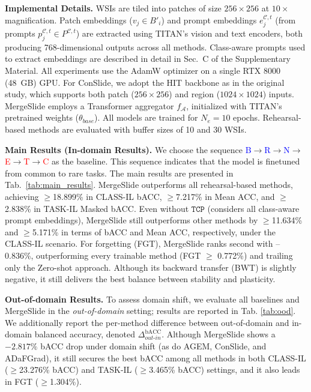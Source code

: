 \documentclass[10pt,twocolumn,letterpaper]{article}
\begin{document}
\noindent\textbf{Implemental Details.} WSIs are tiled into patches of size $256 \times 256$ at $10\times$ magnification. Patch embeddings ($v_j \in B'_i$) and prompt embeddings $e^{\mathcal{C},t}_j$ (from prompts $p^{\mathcal{C},t}_j \in P^{\mathcal{C},t}$) are extracted using TITAN's vision and text encoders, both producing 768-dimensional outputs across all methods. {Class-aware prompts used to extract embeddings are described in detail in Sec.~C of the Supplementary Material.} All experiments use the AdamW optimizer \cite{loshchilov2017decoupled} on a single RTX 8000 (48~GB) GPU. For ConSlide, we adopt the HIT backbone as in the original study, which supports both patch ($256\times256$) and region ($1024\times1024$) inputs. MergeSlide employs a Transformer aggregator $f_{\mathcal{A}}$, initialized with TITAN’s pretrained weights ($\theta_{{base}}$). All models are trained for $N_e = 10$ epochs. Rehearsal-based methods are evaluated with buffer sizes of 10 and 30 WSIs.

\noindent\textbf{Main Results (In-domain Results).} We choose the sequence \textcolor{blue}{B}$\rightarrow$\textcolor{blue}{R}$\rightarrow$\textcolor{blue}{N}$\rightarrow$\textcolor{red}{E}$\rightarrow$\textcolor{red}{T}$\rightarrow$\textcolor{red}{C} as the baseline. This sequence indicates that the model is finetuned from common to rare tasks. The main results are presented in Tab.~\ref{tab:main_results}. MergeSlide outperforms all rehearsal-based methods, achieving $\geq$18.899\% in CLASS-IL bACC, $\geq$7.217\% in Mean ACC, and $\geq$2.838\% in TASK-IL Masked bACC. Even without $\texttt{TCP}$ (considers all class-aware prompt embeddings), MergeSlide still outperforms other methods by $\geq$11.634\% and $\geq$5.171\% in terms of bACC and Mean ACC, respectively, under the CLASS-IL scenario. For forgetting (FGT), MergeSlide ranks second with –0.836\%, outperforming every trainable method (FGT $\geq$ 0.772\%) and trailing only the Zero-shot approach. Although its backward transfer (BWT) is slightly negative, it still delivers the best balance between stability and plasticity. 

\noindent\textbf{{Out-of-domain Results.}} {To assess domain shift, we evaluate all baselines and MergeSlide in the \textit{out-of-domain} setting; results are reported in Tab. \ref{tab:ood}. We additionally report the per-method difference between out-of-domain and in-domain balanced accuracy, denoted $\Delta^{\text{bACC}}_{out\text{-}in}$. Although MergeSlide shows a $-2.817\%$ bACC drop under domain shift (as do AGEM, ConSlide, and ADaFGrad), it still secures the best bACC among all methods in both CLASS-IL ($\geq$23.276\% bACC) and TASK-IL ($\geq$3.465\% bACC) settings, and it also leads in FGT ($\geq$1.304\%).}
\end{document}
